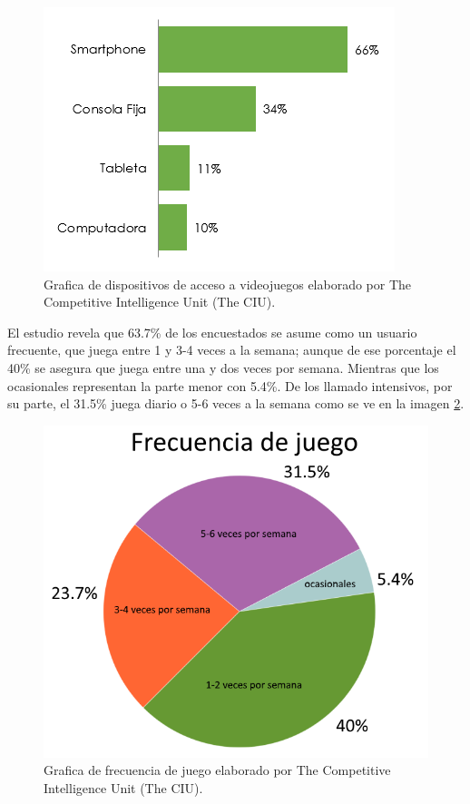 \begin{figure}
	\centering
	\includegraphics[width=\textwidth]{03MarcoTeorico/imageR/dispVid.png}
	\caption{Grafica de dispositivos de acceso a videojuegos elaborado por The Competitive Intelligence Unit (The CIU).}
	\label{fig:dispVid}
\end{figure}

 El estudio revela que 63.7\% de los encuestados se asume como un usuario frecuente, que juega entre 1 y 3-4 veces a la semana; aunque de ese porcentaje el 40\% se asegura que juega entre una y dos veces por semana. Mientras que los ocasionales representan la parte menor con 5.4\%. De los llamado intensivos, por su parte, el 31.5\% juega diario o 5-6 veces a la semana como se ve en la imagen \ref{fig:frecJue}.
\\[1pt] 

\begin{figure}
	\centering
	\includegraphics[width=\textwidth]{03MarcoTeorico/imageR/frecJue.png}
	\caption{Grafica de frecuencia de juego elaborado por The Competitive Intelligence Unit (The CIU).}
	\label{fig:frecJue}
\end{figure}

